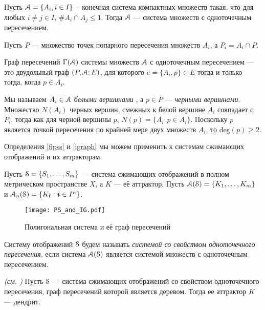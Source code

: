 \begin{definition}\label{fipss}
Пусть ${\EuScript A}=\{A_i,i\in I\}$ -- конечная система компактных множеств такая, что для любых $i\neq j\in I$, $\# A_i\cap A_j \le 1$. 
Тогда ${\EuScript A}$ --- система множеств с одноточечным пересечением.
\end{definition}
 
Пусть $P$ --- множество точек попарного пересечения множеств $A_i$, а $P_i=A_i\cap P$.

\begin{definition}\label{igraph}
Граф пересечений  $\Gamma({\EuScript A})$ системы множеств  ${\EuScript A}$ с одноточечным пересечением --- это двудольный граф  $(P,{\EuScript A}; E)$, для которого  $e=\{A_i,p\}\in E$ тогда и только тогда, когда $p\in A_i$. 
\end{definition}

Мы называем $A_i\in {\EuScript A}$ {\em белыми вершинами} , а $p\in P$ --- {\em черными вершинами}.  
Множество $N(A_i)$ черных вершин, смежных к белой вершине $A_i$ совпадает с $P_i$, тогда как для черной вершины $p$,  $N(p)=\{A_i:p\in A_i\}$. 
Поскольку $p$ является точкой пересечения по крайней мере двух множеств $A_i$, то $ \mathrm{deg}(p)\ge 2$.
 
Определения \ref{fipss} и \ref{igraph}  мы можем применить к системам сжимающих отображений и их аттракторам.

Пусть ${\EuScript S}=\{S_1,\ldots ,S_m\}$ --- система сжимающих отображений в полном метрическом пространстве $X$, а $K$ --- её аттрактор. 
Пусть ${\EuScript A}({\EuScript S})=\{K_1,\ldots , K_m\}$ и ${\EuScript A}_n({\EuScript S})=\{K_{\bm{i}}:{\bm{i}}\in I^n\}$.

\begin{figure}[H]
    \centering
    \texttt{[image: PS\_and\_IG.pdf]}
    \caption{Полигональная система и её граф пересечений}
    \label{img:exgp1}
\end{figure}
 
\begin{definition}\label{fipcs}
Систему отображений ${\EuScript S}$ будем называть {\em системой со свойством одноточечного пересечения}, если система ${\EuScript A}({\EuScript S})$ является системой множеств с одноточечным пересечением.
\end{definition}

\begin{theorem}{\em (см. \cite[Th.1.7]{FPS})} \label{fpden}
Пусть ${\EuScript S}$ --- система сжимающих отображений со свойством одноточечного пересечения, граф пересечений которой является деревом. 
Тогда ее аттрактор $K$ --- дендрит.
\end{theorem}



